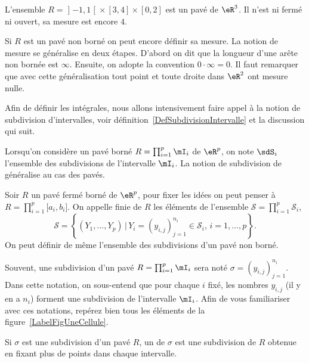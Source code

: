 \begin{example}
 L'ensemble $R=\mathopen] -1 , 1 \mathclose[\times[3,4]\times[0,2]$ est un pavé de $\eR^3$. Il n'est ni fermé ni ouvert, sa mesure est encore $4$.
\end{example}

Si $R$ est un pavé non borné on peut encore définir sa mesure. La notion de mesure se généralise en deux étapes. D'abord on dit que la longueur d'une arête non bornée est $\infty$. Ensuite, on adopte la convention $0\cdot \infty=0$. Il faut remarquer que avec cette généralisation tout point et toute droite dans $\eR^2$ ont mesure nulle.

Afin de définir les intégrales, nous allons intensivement faire appel à la notion de subdivision d'intervalles, voir définition~\ref{DefSubdivisionIntervalle} et la discussion qui suit.

Lorsqu'on considère un pavé borné $R=\prod_{i=1}^p\mI_i$ de $\eR^p$, on note $\sdS_i$ l'ensemble des subdivisions de l'intervalle $\mI_i$. La notion de subdivision de généralise au cas des pavés.
\begin{definition}
	Soir $R$ un pavé fermé borné de $\eR^p$, pour fixer les idées on peut penser à $R=\prod_{i=1}^p\mathopen[ a_i , b_i \mathclose]$. On appelle  finie de $R$ les éléments de l'ensemble $\mathcal{S}=\prod_{i=1}^{p}\mathcal{S}_i$,
\[
\mathcal{S}=\left\{ (Y_{1},\ldots, Y_{p})\,\big\vert\, Y_{i}=(y_{i,j})_{j=1}^{n_i}\in\mathcal{S}_i,\, i=1,\ldots,p\right\}.
\]
On peut définir de même l'ensemble des subdivisions d'un pavé non borné.
 \end{definition}
 Souvent, une subdivision d'un pavé $R=\prod_{i=1}^p\mI_i$ sera noté $\sigma=(y_{i,j})_{j=1}^{n_i}$. Dans cette notation, on sous-entend que pour chaque $i$ fixé, les nombres $y_{i,j}$ (il y en a $n_i$) forment une subdivision de l'intervalle $\mI_i$. Afin de vous familiariser avec ces notations, repérez bien tous les éléments de la figure~\ref{LabelFigUneCellule}.
\newcommand{\CaptionFigUneCellule}{Une cellule d'une subdivision d'un pavé de $\eR^2$. La cellule grisée est $R_{(4,2)}$.}



\begin{definition}
	Si $\sigma$ est une subdivision d'un pavé $R$, un  de $\sigma$ est une subdivision de $R$ obtenue en fixant plus de points dans chaque intervalle.
\end{definition}

